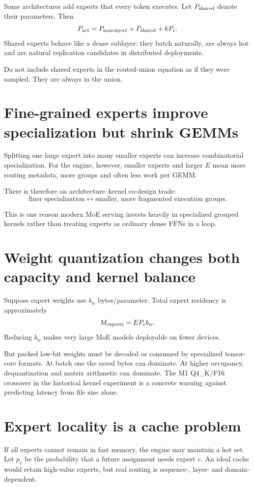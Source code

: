 Some architectures add experts that every token executes. Let $P_{\rm shared}$ denote
their parameters. Then
\[
P_{\rm act}=P_{\rm nonexpert}+P_{\rm shared}+kP_e.
\]
Shared experts behave like a dense sublayer: they batch naturally, are always hot and
are natural replication candidates in distributed deployments.

Do not include shared experts in the routed-union equation as if they were sampled.
They are always in the union.

\section{Fine-grained experts improve specialization but shrink GEMMs}

Splitting one large expert into many smaller experts can increase combinatorial
specialization. For the engine, however, smaller experts and larger $E$ mean more
routing metadata, more groups and often less work per GEMM.

There is therefore an architecture--kernel co-design trade:
\[
\text{finer specialization}
\leftrightarrow
\text{smaller, more fragmented execution groups}.
\]

This is one reason modern MoE serving invests heavily in specialized grouped kernels
rather than treating experts as ordinary dense FFNs in a loop.

\section{Weight quantization changes both capacity and kernel balance}

Suppose expert weights use $b_w$ bytes/parameter. Total expert residency is
approximately
\[
M_{\rm experts}=EP_eb_w.
\]
Reducing $b_w$ makes very large MoE models deployable on fewer devices.

But packed low-bit weights must be decoded or consumed by specialized tensor-core
formats. At batch one the saved bytes can dominate. At higher occupancy, dequantization
and matrix arithmetic can dominate. The M1 Q4\_K/F16 crossover in the historical
kernel experiment is a concrete warning against predicting latency from file size
alone.

\section{Expert locality is a cache problem}

If all experts cannot remain in fast memory, the engine may maintain a hot set. Let
$p_e$ be the probability that a future assignment needs expert $e$. An ideal cache
would retain high-value experts, but real routing is sequence-, layer- and
domain-dependent.

